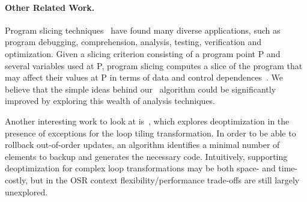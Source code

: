 \paragraph*{Other Related Work.} Program slicing techniques~\cite{Weiser82,Weiser84, Korel88, Agrawal90} have found many diverse applications, such as program debugging, comprehension, analysis, testing, verification and optimization. Given a slicing criterion consisting of a program point P and several variables used at P, program slicing computes a slice of the program that may affect their values at P in terms of data and control dependences~\cite{Tan16}. We believe that the simple ideas behind our \buildcomp\ algorithm could be significantly improved by exploring this wealth of analysis techniques.

Another interesting work to look at is~\cite{Bhandari15}, which explores deoptimization in the presence of exceptions for the loop tiling transformation. In order to be able to rollback out-of-order updates, an algorithm identifies a minimal number of elements to backup and generates the necessary code. Intuitively, supporting deoptimization for complex loop transformations may be both space- and time- costly, but in the OSR context flexibility/performance trade-offs are still largely unexplored.
